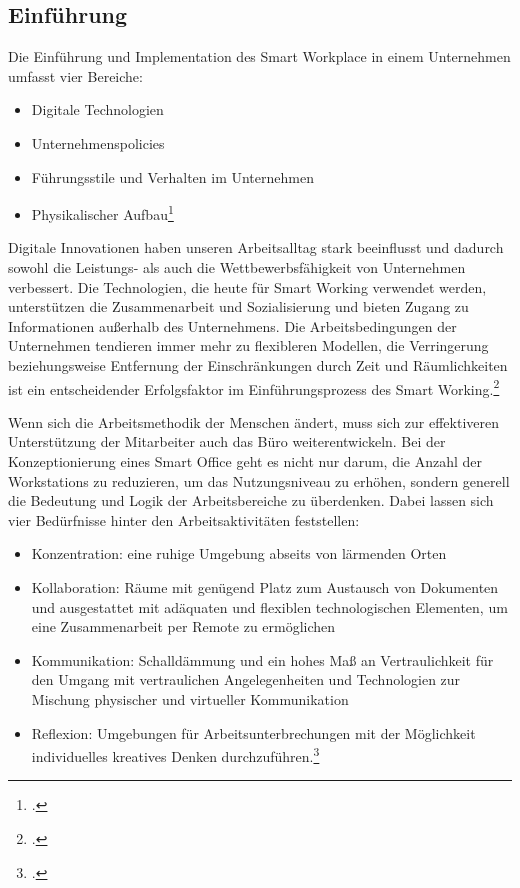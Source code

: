 \newpage
\subsection{Einführung}
Die Einführung und Implementation des Smart Workplace in einem Unternehmen umfasst vier Bereiche:

\begin{itemize}
\item[1.] Digitale Technologien
\item[2.] Unternehmenspolicies
\item[3.] Führungsstile und Verhalten im Unternehmen
\item[4.] Physikalischer Aufbau\footcite[Vgl.][]{efm}
\end{itemize}

Digitale Innovationen haben unseren Arbeitsalltag stark beeinflusst und dadurch sowohl die Leistungs- als auch die Wettbewerbsfähigkeit von Unternehmen verbessert. Die Technologien, die heute für Smart Working verwendet werden, unterstützen die Zusammenarbeit und Sozialisierung und bieten Zugang zu Informationen außerhalb des Unternehmens. Die Arbeitsbedingungen der Unternehmen tendieren immer mehr zu flexibleren Modellen, die Verringerung beziehungsweise Entfernung der Einschränkungen durch Zeit und Räumlichkeiten ist ein entscheidender Erfolgsfaktor im Einführungsprozess des Smart Working.\footcite[Vgl.][]{efm}

Wenn sich die Arbeitsmethodik der Menschen ändert, muss sich zur effektiveren Unterstützung der Mitarbeiter auch das Büro weiterentwickeln. Bei der Konzeptionierung eines Smart Office geht es nicht nur darum, die Anzahl der Workstations zu reduzieren, um das Nutzungsniveau zu erhöhen, sondern generell die Bedeutung und Logik der Arbeitsbereiche zu überdenken. Dabei lassen sich vier Bedürfnisse hinter den Arbeitsaktivitäten feststellen:

\begin{itemize}
\item Konzentration: eine ruhige Umgebung abseits von lärmenden Orten
\item Kollaboration: Räume mit genügend Platz zum Austausch von Dokumenten und ausgestattet mit adäquaten und flexiblen technologischen Elementen, um eine  Zusammenarbeit per Remote zu ermöglichen
\item Kommunikation: Schalldämmung und ein hohes Maß an Vertraulichkeit für den Umgang mit vertraulichen Angelegenheiten und Technologien zur Mischung physischer und virtueller Kommunikation
\item Reflexion: Umgebungen für Arbeitsunterbrechungen mit der Möglichkeit individuelles kreatives Denken durchzuführen.\footcite[Vgl.][]{efm}
\end{itemize}

